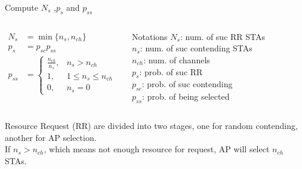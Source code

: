 \documentclass[10pt]{beamer}
\begin{document}
\begin{frame}{Compute $N_s$ ,$p_s$ and $p_{ss}$}
  \begin{columns}[T,onlytextwidth]
	\begin{align}
	\label{equ_Ns}
	N_s &= \min\lbrace n_s, n_{ch}\rbrace \\
	p_s &= p_{sc}p_{ss} \\
	p_{ss} &=
	\begin{cases}
	 \frac{n_{ch}}{n_s},  &n_s > n_{ch}\\
	 1, 				& 1 \leq n_s \leq n_{ch} \\
	 0, 				& n_s = 0
	\end{cases}	
	\label{equ_pss}
	\end{align}
	
	\begin{alertblock}{Notations}
		$N_s$: num. of suc RR STAs \\
    		$n_s$: num. of suc contending STAs \\
    		$n_{ch}$: num. of channels\\
		$p_s$: prob. of suc RR \\
		$p_{sc}$: prob. of suc contending \\   
		$p_{ss}$: prob. of being selected 
	\end{alertblock}
	\end{columns}

Resource Request  (RR) are divided into two stages, one for random contending, another for AP selection. \\
If $n_s > n_{ch}$, which means not enough resource for request, AP will select $n_{ch}$ STAs. 
\end{frame}
\end{document}
